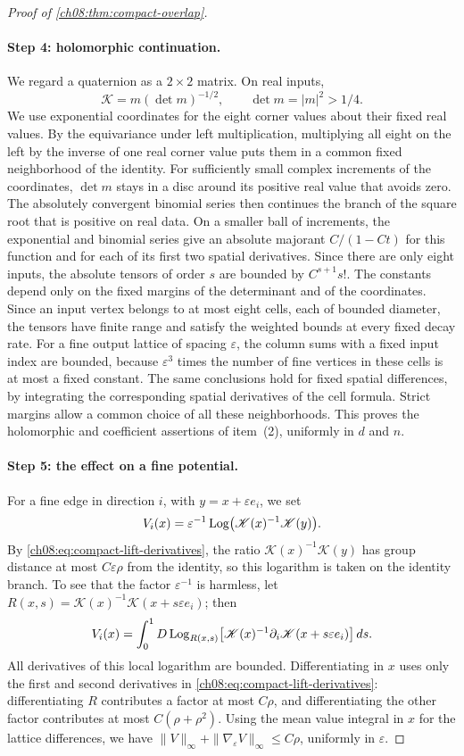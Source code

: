 \begin{proof}[Proof of \cref{ch08:thm:compact-overlap}]
\paragraph{Step 4: holomorphic continuation.}
We regard a quaternion as a $2\times2$ matrix. On real inputs,
\[
 \mathscr K=m(\det m)^{-1/2},\qquad \det m=|m|^2>1/4.
\]
We use exponential coordinates for the eight corner values about their fixed real values. By the equivariance under left multiplication, multiplying all eight on the left by the inverse of one real corner value puts them in a common fixed neighborhood of the identity. For sufficiently small complex increments of the coordinates, $\det m$ stays in a disc around its positive real value that avoids zero. The absolutely convergent binomial series then continues the branch of the square root that is positive on real data. On a smaller ball of increments, the exponential and binomial series give an absolute majorant $C/(1-Ct)$ for this function and for each of its first two spatial derivatives. Since there are only eight inputs, the absolute tensors of order $s$ are bounded by $C^{s+1}s!$. The constants depend only on the fixed margins of the determinant and of the coordinates. Since an input vertex belongs to at most eight cells, each of bounded diameter, the tensors have finite range and satisfy the weighted bounds at every fixed decay rate. For a fine output lattice of spacing $\varepsilon$, the column sums with a fixed input index are bounded, because $\varepsilon^3$ times the number of fine vertices in these cells is at most a fixed constant. The same conclusions hold for fixed spatial differences, by integrating the corresponding spatial derivatives of the cell formula. Strict margins allow a common choice of all these neighborhoods. This proves the holomorphic and coefficient assertions of item~(2), uniformly in $d$ and $n$.

\paragraph{Step 5: the effect on a fine potential.}
For a fine edge in direction $i$, with $y=x+\varepsilon e_i$, we set
\[
 V_i(x)=\varepsilon^{-1}\operatorname{Log}\bigl(\mathscr K(x)^{-1}\mathscr K(y)\bigr).
\]
By \eqref{ch08:eq:compact-lift-derivatives}, the ratio $\mathscr K(x)^{-1}\mathscr K(y)$ has group distance at most $C\varepsilon\rho$ from the identity, so this logarithm is taken on the identity branch. To see that the factor $\varepsilon^{-1}$ is harmless, let $R(x,s)=\mathscr K(x)^{-1}\mathscr K(x+s\varepsilon e_i)$; then
\[
 V_i(x)=\int_0^1D\operatorname{Log}_{R(x,s)}
       \bigl[\mathscr K(x)^{-1}\partial_i\mathscr K(x+s\varepsilon e_i)\bigr]\,ds.
\]
All derivatives of this local logarithm are bounded. Differentiating in $x$ uses only the first and second derivatives in \eqref{ch08:eq:compact-lift-derivatives}: differentiating $R$ contributes a factor at most $C\rho$, and differentiating the other factor contributes at most $C(\rho+\rho^2)$. Using the mean value integral in $x$ for the lattice differences, we have $\|V\|_\infty+\|\nabla_\varepsilon V\|_\infty\le C\rho$, uniformly in $\varepsilon$.


\end{proof}
